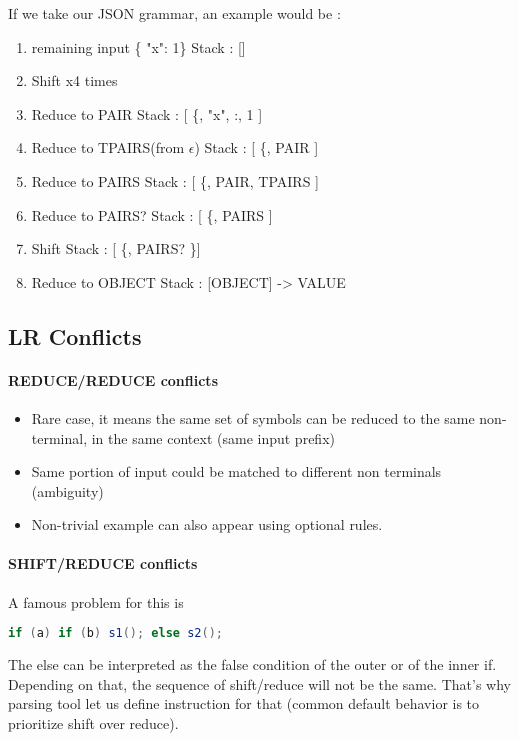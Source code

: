         If we take our JSON grammar, an example would be :
        \begin{enumerate}
            \item remaining input \{ "x": 1\} Stack : []
            \item Shift x4 times
            \item Reduce to PAIR Stack : [ \{, "x", :, 1 ]
            \item Reduce to TPAIRS(from $\epsilon$) Stack : [ \{, PAIR ]
            \item Reduce to PAIRS Stack : [ \{, PAIR, TPAIRS ]
            \item Reduce to PAIRS? Stack : [ \{, PAIRS ]
            \item Shift Stack : [ \{, PAIRS? \}]
            \item Reduce to OBJECT Stack : [OBJECT] -> VALUE 
        \end{enumerate}
    \subsection{LR Conflicts}
        \paragraph{REDUCE/REDUCE conflicts}
            \begin{itemize}
                \item Rare case, it means the same set of symbols can be reduced
                to the same non-terminal, in the same context (same input prefix)
                \item Same portion of input could be matched to different non
                terminals (ambiguity)
                \item Non-trivial example can also appear using optional rules.
            \end{itemize}
        \paragraph{SHIFT/REDUCE conflicts}
            A famous problem for this is 
            \begin{lstlisting}[language=Java]
                if (a) if (b) s1(); else s2();
            \end{lstlisting}
            The else can be interpreted as the false condition of the outer or
            of the inner if. Depending on that, the sequence of shift/reduce
            will not be the same. That's why parsing tool let us define
            instruction for that (common default behavior is to prioritize shift
            over reduce).
